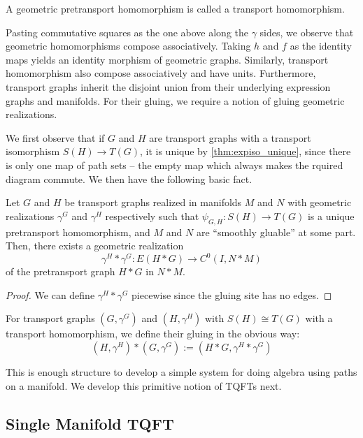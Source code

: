 \documentclass[./Thick_TQFTs_and_Quantum_Information.tex]{subfiles}
\begin{document}
\begin{defn}
A geometric pretransport homomorphism is called a transport homomorphism.
\end{defn}

Pasting commutative squares as the one above along the $\gamma$ sides, we
observe that geometric homomorphisms compose associatively. Taking
$h$ and $f$ as the identity maps yields an identity morphism of geometric
graphs. Similarly, transport homomorphism also compose associatively and have
units. Furthermore, transport graphs inherit the disjoint union from their
underlying expression graphs and manifolds. For their gluing, we require a
notion of gluing geometric realizations.

We first observe that if $G$ and $H$ are transport graphs with a transport
isomorphism $S(H) \to T(G)$, it is unique by \ref{thm:expiso_unique}, since
there is only one map of path sets -- the empty map which always makes the
rquired diagram commute. We then have the following basic fact.

\begin{cor}
Let $G$ and $H$ be transport graphs realized in manifolds
$M$ and $N$ with geometric realizations $\gamma^G$ and
$\gamma^H$ respectively such that $\psi_{G, H} : S(H) \to T(G)$ is a unique
pretransport homomorphism, and $M$ and $N$ are ``smoothly gluable'' at some
part. Then, there exists a geometric realization
\[
  \gamma^H * \gamma^G : E(H * G) \to C^0(I, N * M)
\]
of the pretransport graph $H * G$ in $N * M$.
\end{cor}
\begin{proof}
We can define $\gamma^H * \gamma^G$ piecewise since the gluing site has no
edges.
\end{proof}

\begin{defn}
For transport graphs $(G, \gamma^G)$ and $(H, \gamma^H)$ with $S(H) \cong T(G)$
with a transport homomorphism, we define their gluing in the obvious way:
\[
  (H, \gamma^H) * (G, \gamma^G) := (H * G, \gamma^H * \gamma^G)
\]
\end{defn}

This is enough structure to develop a simple system for doing algebra using
paths on a manifold. We develop this primitive notion of TQFTs next. 

\subsection{Single Manifold TQFT}
\end{document}
